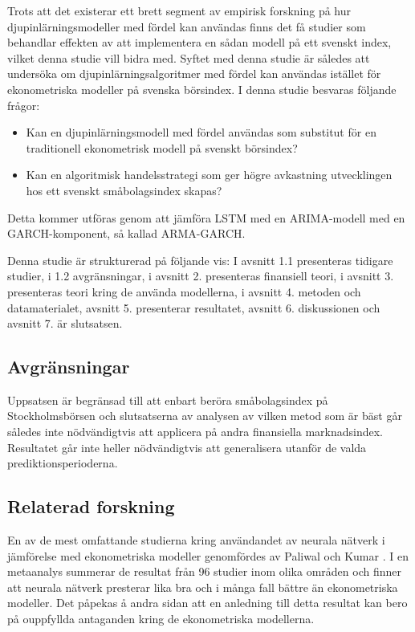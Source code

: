 \documentclass[11pt]{article}
\numberwithin{equation}{section}
\numberwithin{table}{section}
\numberwithin{figure}{section}
\begin{document}
Trots att det existerar ett brett segment av empirisk forskning på hur djupinlärningsmodeller med fördel kan användas finns det få studier som behandlar effekten av att implementera en sådan modell på ett svenskt index, vilket denna studie vill bidra med. Syftet med denna studie är således att undersöka om djupinlärningsalgoritmer med fördel kan användas istället för ekonometriska modeller på svenska börsindex. I denna studie besvaras följande frågor:

\begin{itemize}
    \item Kan en djupinlärningsmodell med fördel användas som substitut för en traditionell ekonometrisk modell på svenskt börsindex?
    \item Kan en algoritmisk handelsstrategi som ger högre avkastning utvecklingen hos ett svenskt småbolagsindex skapas?
\end{itemize}

Detta kommer utföras genom att jämföra LSTM med en ARIMA-modell med en GARCH-komponent, så kallad ARMA-GARCH. 

Denna studie är strukturerad på följande vis: I avsnitt 1.1 presenteras tidigare studier, i 1.2 avgränsningar, i avsnitt 2. presenteras finansiell teori, i avsnitt 3. presenteras teori kring de använda modellerna, i avsnitt 4. metoden och datamaterialet, avsnitt 5. presenterar resultatet, avsnitt 6. diskussionen och avsnitt 7. är slutsatsen. 

\subsection{Avgränsningar}
Uppsatsen är begränsad till att enbart beröra småbolagsindex på Stockholmsbörsen och slutsatserna av analysen av vilken metod som är bäst går således inte nödvändigtvis att applicera på andra finansiella marknadsindex. Resultatet går inte heller nödvändigtvis att generalisera utanför de valda prediktionsperioderna.




\subsection{Relaterad forskning}

En av de mest omfattande studierna kring användandet av neurala nätverk i jämförelse med ekonometriska modeller genomfördes av Paliwal och Kumar \parencite*{paliwal2009neural}. I en metaanalys summerar de resultat från 96 studier inom olika områden och finner att neurala nätverk presterar lika bra och i många fall bättre än ekonometriska modeller. Det påpekas å andra sidan att en anledning till detta resultat kan bero på ouppfyllda antaganden kring de ekonometriska modellerna. 
\end{document}
